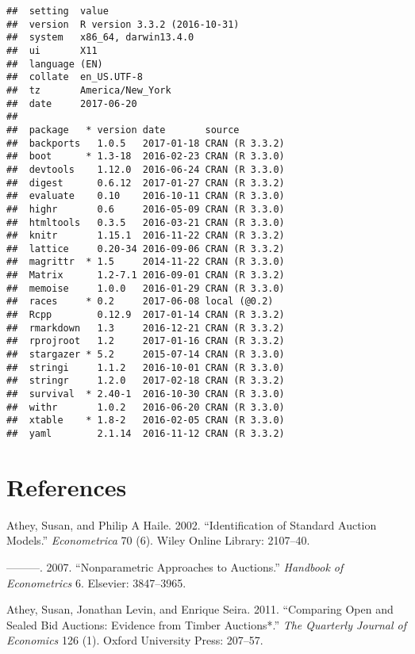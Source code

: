 \documentclass[11pt, titlepage]{article}
\begin{document}
\begin{verbatim}
##  setting  value                       
##  version  R version 3.3.2 (2016-10-31)
##  system   x86_64, darwin13.4.0        
##  ui       X11                         
##  language (EN)                        
##  collate  en_US.UTF-8                 
##  tz       America/New_York            
##  date     2017-06-20                  
## 
##  package   * version date       source        
##  backports   1.0.5   2017-01-18 CRAN (R 3.3.2)
##  boot      * 1.3-18  2016-02-23 CRAN (R 3.3.0)
##  devtools    1.12.0  2016-06-24 CRAN (R 3.3.0)
##  digest      0.6.12  2017-01-27 CRAN (R 3.3.2)
##  evaluate    0.10    2016-10-11 CRAN (R 3.3.0)
##  highr       0.6     2016-05-09 CRAN (R 3.3.0)
##  htmltools   0.3.5   2016-03-21 CRAN (R 3.3.0)
##  knitr       1.15.1  2016-11-22 CRAN (R 3.3.2)
##  lattice     0.20-34 2016-09-06 CRAN (R 3.3.2)
##  magrittr  * 1.5     2014-11-22 CRAN (R 3.3.0)
##  Matrix      1.2-7.1 2016-09-01 CRAN (R 3.3.2)
##  memoise     1.0.0   2016-01-29 CRAN (R 3.3.0)
##  races     * 0.2     2017-06-08 local (@0.2)  
##  Rcpp        0.12.9  2017-01-14 CRAN (R 3.3.2)
##  rmarkdown   1.3     2016-12-21 CRAN (R 3.3.2)
##  rprojroot   1.2     2017-01-16 CRAN (R 3.3.2)
##  stargazer * 5.2     2015-07-14 CRAN (R 3.3.0)
##  stringi     1.1.2   2016-10-01 CRAN (R 3.3.0)
##  stringr     1.2.0   2017-02-18 CRAN (R 3.3.2)
##  survival  * 2.40-1  2016-10-30 CRAN (R 3.3.0)
##  withr       1.0.2   2016-06-20 CRAN (R 3.3.0)
##  xtable    * 1.8-2   2016-02-05 CRAN (R 3.3.0)
##  yaml        2.1.14  2016-11-12 CRAN (R 3.3.2)
\end{verbatim}

\section*{References}\label{references}

\hypertarget{refs}{}
\hypertarget{ref-athey2002identification}{}
Athey, Susan, and Philip A Haile. 2002. ``Identification of Standard
Auction Models.'' \emph{Econometrica} 70 (6). Wiley Online Library:
2107--40.

\hypertarget{ref-athey2007nonparametric}{}
---------. 2007. ``Nonparametric Approaches to Auctions.''
\emph{Handbook of Econometrics} 6. Elsevier: 3847--3965.

\hypertarget{ref-athey2011comparing}{}
Athey, Susan, Jonathan Levin, and Enrique Seira. 2011. ``Comparing Open
and Sealed Bid Auctions: Evidence from Timber Auctions*.'' \emph{The
Quarterly Journal of Economics} 126 (1). Oxford University Press:
207--57.
\end{document}
